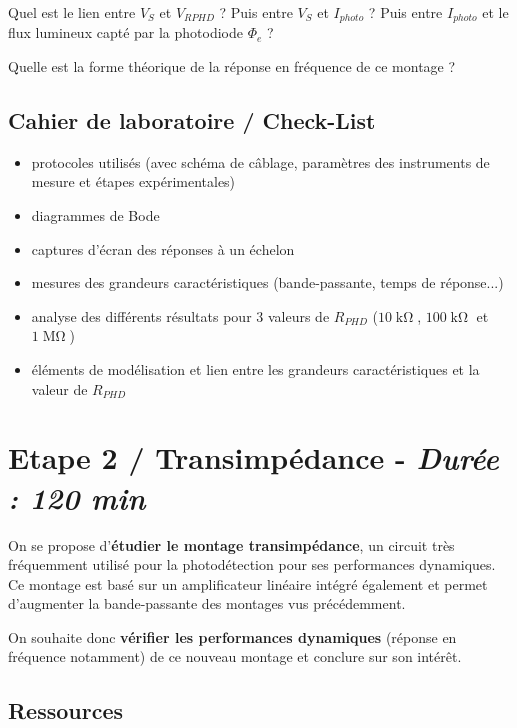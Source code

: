 \Quest Quel est le lien entre $V_S$ et $V_{RPHD}$ ? Puis entre $V_S$ et $I_{photo}$ ? Puis entre $I_{photo}$ et le flux lumineux capté par la photodiode $\Phi_e$ ?

\Quest Quelle est la forme théorique de la réponse en fréquence de ce montage ?


\subsection{Cahier de laboratoire / Check-List}

\begin{itemize}[label=$\square$]
	\item protocoles utilisés (avec schéma de câblage, paramètres des instruments de mesure et étapes expérimentales)
	\item diagrammes de Bode
	\item captures d'écran des réponses à un échelon
	\item mesures des grandeurs caractéristiques (bande-passante, temps de réponse...)
	\item analyse des différents résultats pour 3 valeurs de $R_{PHD}$ ($10\operatorname{k\Omega}$, $100\operatorname{k\Omega}$ et $1\operatorname{M\Omega}$)
	\item éléments de modélisation et lien entre les grandeurs caractéristiques et la valeur de $R_{PHD}$
\end{itemize}


\clearpage
\section{Etape 2 / Transimpédance - \textit{Durée : 120 min}}

On se propose d'\textbf{étudier le montage transimpédance}, un circuit très fréquemment utilisé pour la photodétection pour ses performances dynamiques. Ce montage est basé sur un amplificateur linéaire intégré également et permet d'augmenter la bande-passante des montages vus précédemment.

On souhaite donc \textbf{vérifier les performances dynamiques} (réponse en fréquence notamment) de ce nouveau montage et conclure sur son intérêt.

\subsection{Ressources}

